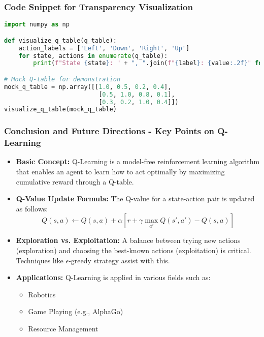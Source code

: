 \documentclass{beamer}
\begin{document}
\begin{frame}[fragile]
    \frametitle{Code Snippet for Transparency Visualization}
    \begin{lstlisting}[language=Python]
import numpy as np

def visualize_q_table(q_table):
    action_labels = ['Left', 'Down', 'Right', 'Up']
    for state, actions in enumerate(q_table):
        print(f"State {state}: " + ", ".join(f"{label}: {value:.2f}" for label, value in zip(action_labels, actions)))

# Mock Q-table for demonstration
mock_q_table = np.array([[1.0, 0.5, 0.2, 0.4],
                          [0.5, 1.0, 0.8, 0.1],
                          [0.3, 0.2, 1.0, 0.4]])
visualize_q_table(mock_q_table)
    \end{lstlisting}
\end{frame}

\begin{frame}[fragile]
    \frametitle{Conclusion and Future Directions - Key Points on Q-Learning}
    \begin{itemize}
        \item \textbf{Basic Concept:} 
        Q-Learning is a model-free reinforcement learning algorithm that enables an agent to learn how to act optimally by maximizing cumulative reward through a Q-table.
        
        \item \textbf{Q-Value Update Formula:} 
        The Q-value for a state-action pair is updated as follows:
        \begin{equation}
        Q(s, a) \leftarrow Q(s, a) + \alpha [r + \gamma \max_{a'} Q(s', a') - Q(s, a)]
        \end{equation}
        
        \item \textbf{Exploration vs. Exploitation:} A balance between trying new actions (exploration) and choosing the best-known actions (exploitation) is critical. Techniques like $\epsilon$-greedy strategy assist with this.
        
        \item \textbf{Applications:}
        Q-Learning is applied in various fields such as:
        \begin{itemize}
            \item Robotics
            \item Game Playing (e.g., AlphaGo)
            \item Resource Management
        \end{itemize}
    \end{itemize}
\end{frame}
\end{document}
